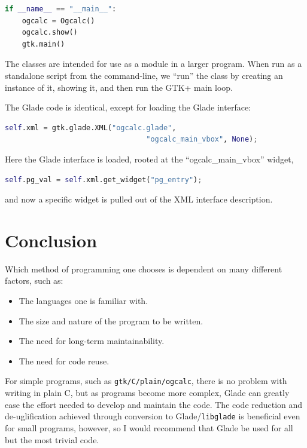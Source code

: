 \documentclass[a4paper,oneside]{article}
\newcommand{\program}[1]{\texttt{#1}}
\begin{document}
\begin{lstlisting}[numbers=none, language=Python]
if __name__ == "__main__":
    ogcalc = Ogcalc()
    ogcalc.show()
    gtk.main()
\end{lstlisting}

The classes are intended for use as a module in a larger program.
When run as a standalone script from the command-line, we ``run'' the
class by creating an instance of it, showing it, and then run the GTK+
main loop.

The Glade code is identical, except for loading the Glade interface:

\begin{lstlisting}[numbers=none, language=Python]
        self.xml = gtk.glade.XML("ogcalc.glade",
                                 "ogcalc_main_vbox", None);
\end{lstlisting}

Here the Glade interface is loaded, rooted at the
``ogcalc\_main\_vbox'' widget,

\begin{lstlisting}[numbers=none, language=Python]
        self.pg_val = self.xml.get_widget("pg_entry");
\end{lstlisting}

\noindent and now a specific widget is pulled out of the XML interface
description.


\section{Conclusion}

Which method of programming one chooses is dependent on many different
factors, such as:

\begin{itemize}
\item{The languages one is familiar with.}
\item{The size and nature of the program to be written.}
\item{The need for long-term maintainability.}
\item{The need for code reuse.}
\end{itemize}

For simple programs, such as \program{gtk/C/plain/ogcalc}, there is no
problem with writing in plain C, but as programs become more complex,
Glade can greatly ease the effort needed to develop and maintain the
code.  The code reduction and de-uglification achieved through
conversion to Glade/\program{libglade} is beneficial even for small
programs, however, so I would recommend that Glade be used for all but
the most trivial code.
\end{document}
